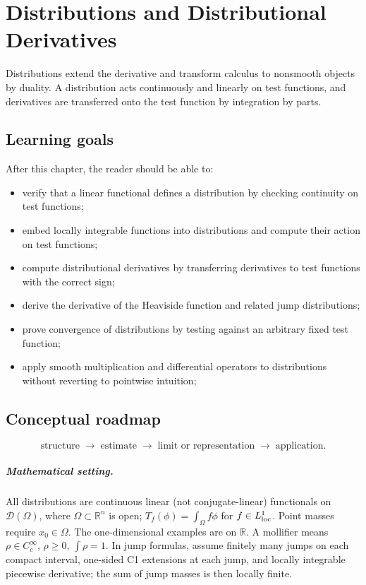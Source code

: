\chapter{Distributions and Distributional Derivatives}
\label{ch:iii16}

Distributions extend the derivative and transform calculus to nonsmooth objects by duality. A distribution acts continuously and linearly on test functions, and derivatives are transferred onto the test function by integration by parts.

\section*{Learning goals}
After this chapter, the reader should be able to:
\begin{itemize}
\item verify that a linear functional defines a distribution by checking continuity on test functions;
\item embed locally integrable functions into distributions and compute their action on test functions;
\item compute distributional derivatives by transferring derivatives to test functions with the correct sign;
\item derive the derivative of the Heaviside function and related jump distributions;
\item prove convergence of distributions by testing against an arbitrary fixed test function;
\item apply smooth multiplication and differential operators to distributions without reverting to pointwise intuition;
\end{itemize}
\section*{Conceptual roadmap}
\[
\boxed{\text{structure}\;\longrightarrow\;\text{estimate}\;\longrightarrow\;\text{limit or representation}\;\longrightarrow\;\text{application}.}
\]

\paragraph{Mathematical setting.}
All distributions are continuous linear (not conjugate-linear) functionals on $\mathcal D(\Omega)$, where $\Omega\subset\mathbb R^n$ is open; $T_f(\phi)=\int_\Omega f\phi$ for $f\in L^1_{\rm loc}$. Point masses require $x_0\in\Omega$. The one-dimensional examples are on $\mathbb R$. A mollifier means $\rho\in C_c^\infty$, $\rho\ge0$, $\int\rho=1$. In jump formulas, assume finitely many jumps on each compact interval, one-sided C1 extensions at each jump, and locally integrable piecewise derivative; the sum of jump masses is then locally finite.

